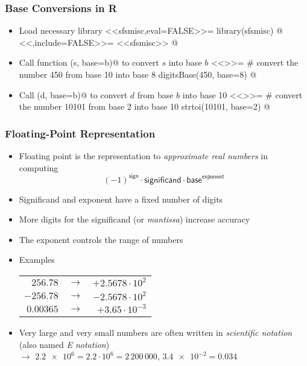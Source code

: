\documentclass[%
  final,
  11pt, 
  show notes, %
  t, %
  fleqn, %
]{beamer}
\begin{document}
\begin{frame}[fragile]
  \frametitle{Base Conversions in R}
\begin{itemize}
\item Load necessary library \verb@sfsmisc@
<<sfsmisc,eval=FALSE>>=
library(sfsmisc)
@
<<,include=FALSE>>=
<<sfsmisc>>
@
\item Call function \verb@digitsBase(s, base=b)@ to convert $s$ into base $b$
<<>>=
# convert the number 450 from base 10 into base 8
digitsBase(450, base=8)
@
\item Call \verb@strtoi(d, base=b)@ to convert $d$ from base $b$ into base 10
<<>>=
# convert the number 10101 from base 2 into base 10
strtoi(10101, base=2) 
@
\end{itemize}
\end{frame}

\begin{frame}[fragile]
  \frametitle{Floating-Point Representation}
\begin{itemize}
\item Floating point is the representation to \emph{approximate real numbers} in computing
\begin{equation*}
(-1)^\mathsf{sign} \cdot \mathsf{significand} \cdot \mathsf{base}^\mathsf{exponent}
\end{equation*}
\item Significand and exponent have a fixed number of digits
\item More digits for the significand (or \emph{mantissa}) increase accuracy
\item The exponent controls the range of numbers
\item Examples\\
\qquad
\begin{tabular}{rcr}
$256.78$ & $\rightarrow$ & $+2.5678 \cdot 10^2$ \\
$-256.78$ & $\rightarrow$ & $-2.5678 \cdot 10^2$ \\
$0.00365$ & $\rightarrow$ & $+3.65 \cdot 10^{-3}$ \\
\end{tabular}

\vspace*{0.3cm}
\item Very large and very small numbers are often written in \emph{scientific notation} (also named \emph{E notation}) \\
$\rightarrow$ \eg $\num[output-exponent-marker=\text{e},exponent-product={}]{2.2e6} = 2.2 \cdot 10^6 = 2\,200\,000$, $\num[output-exponent-marker=\text{e},exponent-product={}]{3.4e-2} = 0.034$
\end{itemize}
\end{frame}
\end{document}
